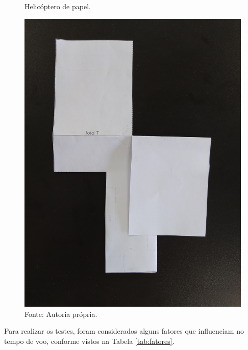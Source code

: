 

\begin{figure}[H]
  \caption{Helicóptero de papel.}
  \centering
  \includegraphics[angle=0,width=1\textwidth]{images/IMG_20200918_162251.jpg}
  \caption*{Fonte: Autoria própria.}
  \label{fig:heli_papel}
\end{figure}

Para realizar os testes, foram considerados alguns fatores que influenciam no tempo de voo, conforme vistos na Tabela \ref{tab:fatores}.

